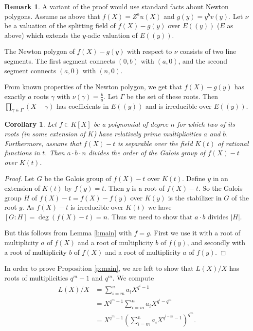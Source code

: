 \documentclass[12pt]{article}
\theoremstyle{plain}
\newtheorem{corollary}[theorem]{Corollary}
\theoremstyle{definition}
\newtheorem{remark}[theorem]{Remark}
\newcommand{\abs}[1]{\lvert#1\rvert}
\begin{document}
\begin{remark}
  A variant of the proof would use standard facts about Newton
  polygons. Assume as above that $f(X)=Z^au(X)$ and
  $g(y)=y^bv(y)$. Let $\nu$ be a valuation of the splitting field of
  $f(X)-g(y)$ over $E((y))$ ($E$ as above) which extends the $y$-adic
  valuation of $E((y))$.

  The Newton polygon of $f(X)-g(y)$ with respect to $\nu$ consists of
  two line segments. The first segment connects $(0, b)$ with
  $(a, 0)$, and the second segment connects $(a, 0)$ with $(n, 0)$.

  From known properties of the Newton polygon, we get that $f(X)-g(y)$
  has exactly $a$ roots $\gamma$ with $\nu(\gamma)=\frac{b}{a}$. Let
  $\Gamma$ be the set of these roots. Then
  $\prod_{\gamma\in\Gamma}(X-\gamma)$ has coefficients in $E((y))$ and
  is irreducible over $E((y))$.
\end{remark}
\begin{corollary}
  Let $f\in K[X]$ be a polynomial of degree $n$ for which two of its
  roots (in some extension of $K$) have relatively prime
  multiplicities $a$ and $b$. Furthermore, assume that $f(X)-t$ is
  separable over the field $K(t)$ of rational functions in $t$. Then
  $a\cdot b\cdot n$ divides the order of the Galois group of $f(X)-t$
  over $K(t)$.
\end{corollary}
\begin{proof}
  Let $G$ be the Galois group of $f(X)-t$ over $K(t)$. Define $y$ in
  an extension of $K(t)$ by $f(y)=t$. Then $y$ is a root of
  $f(X)-t$. So the Galois group $H$ of $f(X)-t=f(X)-f(y)$ over $K(y)$
  is the stabilizer in $G$ of the root $y$. As $f(X)-t$ is irreducible
  over $K(t)$ we have $[G:H]=\deg (f(X)-t)=n$. Thus we need to show
  that $a\cdot b$ divides $\abs{H}$.

  But this follows from Lemma \ref{l:main} with $f=g$. First we use it
  with a root of multiplicity $a$ of $f(X)$ and a root of multiplicity
  $b$ of $f(y)$, and secondly with a root of multiplicity $b$ of
  $f(X)$ and a root of multiplicity $a$ of $f(y)$.
\end{proof}
In order to prove Proposition \ref{p:main}, we are left to show that
$L(X)/X$ has roots of multiplicities $q^m-1$ and $q^m$. We compute
\begin{align*}
  L(X)/X%
  &= \sum_{i=m}^na_iX^{q^i-1}\\
  &= X^{q^m-1}\sum_{i=m}^na_iX^{q^i-q^m}\\
  &= X^{q^m-1}(\sum_{i=m}^na_iX^{q^{i-m}-1})^{q^m}.
\end{align*}
\end{document}
